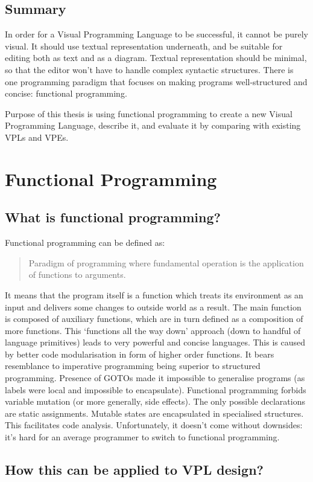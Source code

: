 \documentclass[11pt]{scrartcl}
\begin{document}
\subsection{Summary}
In order for a Visual Programming Language to be successful, it cannot be purely
visual.
It should use textual representation underneath, and be suitable for editing
both as text and as a diagram.
Textual representation should be minimal, so that the editor won’t have  to
handle complex syntactic structures.
There is one programming paradigm that focuses on making programs
well-structured and concise: functional programming.

Purpose of this thesis is using functional programming to create a new Visual
Programming Language, describe it, and evaluate it by comparing with existing
VPLs and VPEs.


\section{Functional Programming}
\subsection{What is functional programming?}
Functional programming can be defined as:
\blockquote[{\cite{Hughes:1989:WFP:63410.63411}}]{Paradigm of programming where
  fundamental operation is the application of functions to arguments.}

It means that the program itself is a function which treats its environment as
an input and delivers some changes to outside world as a result.
The main function is composed of auxiliary functions, which are in turn defined
as a composition of more functions.
This ‘functions all the way down’ approach (down to handful of language
primitives) leads to very powerful and concise languages.
This is caused by better code modularisation in form of higher order functions.
It bears resemblance to imperative programming being superior to structured
programming.
Presence of GOTOs made it impossible to generalise programs (as labels were
local and impossible to encapsulate).
Functional programming forbids variable mutation (or more generally, side
effects).
The only possible declarations are static assignments.
Mutable states are encapsulated in specialised structures.
This facilitates code analysis.
Unfortunately, it doesn’t come without downsides: it’s hard for an average
programmer to switch to functional programming.


\subsection{How this can be applied to VPL design?}
\end{document}
